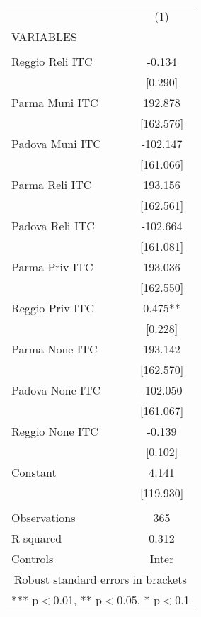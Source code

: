 \begin{tabular}{lc} \hline
 & (1) \\
VARIABLES &  \\ \hline
 &  \\
Reggio Reli ITC & -0.134 \\
 & [0.290] \\
Parma Muni ITC & 192.878 \\
 & [162.576] \\
Padova Muni ITC & -102.147 \\
 & [161.066] \\
Parma Reli ITC & 193.156 \\
 & [162.561] \\
Padova Reli ITC & -102.664 \\
 & [161.081] \\
Parma Priv ITC & 193.036 \\
 & [162.550] \\
Reggio Priv ITC & 0.475** \\
 & [0.228] \\
Parma None ITC & 193.142 \\
 & [162.570] \\
Padova None ITC & -102.050 \\
 & [161.067] \\
Reggio None ITC & -0.139 \\
 & [0.102] \\
Constant & 4.141 \\
 & [119.930] \\
 &  \\
Observations & 365 \\
R-squared & 0.312 \\
 Controls & Inter \\ \hline
\multicolumn{2}{c}{ Robust standard errors in brackets} \\
\multicolumn{2}{c}{ *** p$<$0.01, ** p$<$0.05, * p$<$0.1} \\
\end{tabular}

